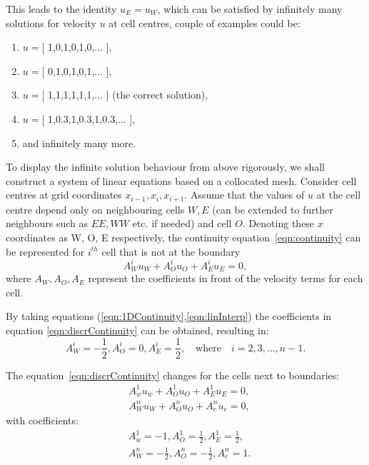 \documentclass{article}
\begin{document}
This leads to the identity $u_E=u_W$, which can be satisfied by infinitely many solutions for velocity $u$ at cell centres, couple of examples could be:

\begin{enumerate}
	\item[] $u=${[ 1,0,1,0,1,0,... ]},
	\item[] $u=${[ 0,1,0,1,0,1,... ]},
	\item[] $u=${[ 1,1,1,1,1,1,... ]} (the correct solution),
	\item[] $u=${[ 1,0.3,1,0.3,1,0.3,... ]},
	\item[] and infinitely many more.
\end{enumerate}


To display the infinite solution behaviour from above rigorously, we shall construct a system of linear equations based on a collocated mesh. Consider cell centres at grid coordinates $x_{i-1},x_{i}, x_{i+1}$. Assume that the values of $u$ at the cell centre depend only on neighbouring cells $W,E$ (can be extended to further neighbours such as $EE, WW$ etc. if needed) and cell $O$. Denoting these $x$ coordinates as W, O, E respectively, the continuity equation~\eqref{eqn:continuity} can be represented for $i^{th}$ cell that is not at the boundary 
	\begin{equation}\label{eqn:discrContinuity}
		A_W^i u_{W} + A_O^i u_O + A_E^i u_{E}=0,
	\end{equation}
	where $A_W, A_O, A_E$ represent the coefficients in front of the velocity terms for each cell.
	
By taking equations (\eqref{eqn:1DContinuity},\eqref{eqn:linInterp}) the coefficients in equation \eqref{eqn:discrContinuity} can be obtained, resulting in: 
\begin{equation*}
	A_W^i=-\frac{1}{2},A_O^i=0,A_E^i=\frac{1}{2}, \quad\text{where} \quad i=2,3,\dots,n-1.
\end{equation*}

The equation~\eqref{eqn:discrContinuity} changes for the cells next to boundaries:
\begin{equation*}
	\begin{aligned}
		&A_w^1 u_{w} + A_O^1 u_O + A_E^1 u_{E}=0,\\
		&A_W^n u_{W} + A_O^n u_O + A_e^n u_{e}=0,
	\end{aligned}
\end{equation*}
with coefficients:
\begin{equation*}
	\begin{aligned}
		&A_w^1=-1,A_O^1=\frac{1}{2},A_E^1=\frac{1}{2},\\
		&A_W^n=-\frac{1}{2},A_O^n=-\frac{1}{2},A_e^n=1.
	\end{aligned}
\end{equation*}
\end{document}
